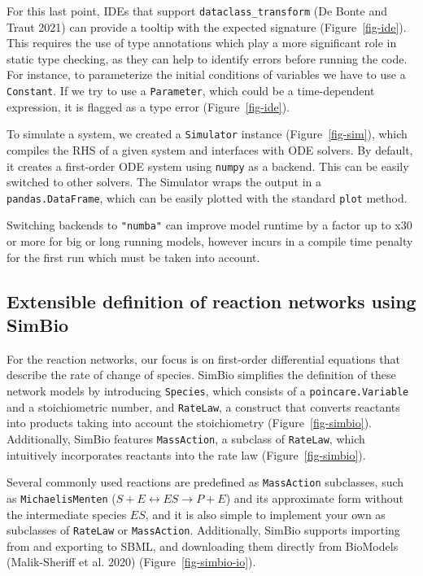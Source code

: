 \documentclass[
  letterpaper,
  DIV=11,
  numbers=noendperiod]{scrartcl}
\begin{document}


For this last point, \acp{IDE} that support \texttt{dataclass\_transform} (De
Bonte and Traut 2021) can provide a tooltip with the expected signature
(Figure~\ref{fig-ide}). This requires the use of type
annotations which play a more significant role in static type checking,
as they can help to identify errors before running the code. For
instance, to parameterize the initial conditions of variables we have to
use a \texttt{Constant}. If we try to use a \texttt{Parameter}, which
could be a time-dependent expression, it is flagged as a type error
(Figure~\ref{fig-ide}).

To simulate a system, we created a \texttt{Simulator} instance
(Figure~\ref{fig-sim}), which compiles the \ac{RHS} of a given system and interfaces
with \ac{ODE} solvers. By default, it creates a first-order
\ac{ODE} system using \texttt{numpy} as a backend. This can be
easily switched to other solvers. The Simulator wraps the output in a
\texttt{pandas.DataFrame}, which can be easily plotted with the standard
\texttt{plot} method.

Switching backends to \texttt{"numba"} can improve model runtime by a
factor up to x30 or more for big or long running models, however incurs
in a compile time penalty for the first run which must be taken into
account.

\hypertarget{extensible-definition-of-reaction-networks-using-simbio}{%
\subsection{Extensible definition of reaction networks using
SimBio}\label{extensible-definition-of-reaction-networks-using-simbio}}

For the reaction networks, our focus is on first-order differential
equations that describe the rate of change of species. SimBio simplifies
the definition of these network models by introducing \texttt{Species},
which consists of a \texttt{poincare.Variable} and a stoichiometric
number, and \texttt{RateLaw}, a construct that converts reactants into
products taking into account the stoichiometry
(Figure~\ref{fig-simbio}). Additionally, SimBio features
\texttt{MassAction}, a subclass of \texttt{RateLaw}, which intuitively
incorporates reactants into the rate law (Figure~\ref{fig-simbio}).

Several commonly used reactions are predefined as \texttt{MassAction}
subclasses, such as \texttt{MichaelisMenten}
(\(S + E \leftrightarrow ES \rightarrow P + E\)) and its approximate
form without the intermediate species \(ES\), and it is also simple to
implement your own as subclasses of \texttt{RateLaw} or
\texttt{MassAction}. Additionally, SimBio supports importing from and
exporting to \ac{SBML}, and downloading them directly from BioModels
(Malik-Sheriff et al. 2020) (Figure~\ref{fig-simbio-io}).
\end{document}
